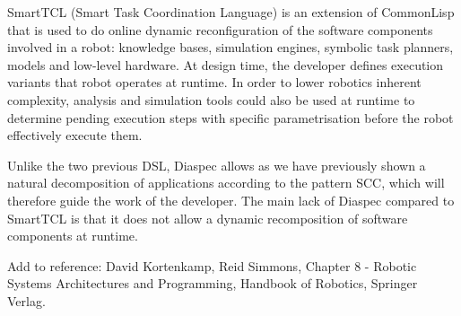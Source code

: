 \begin{enumerate}
SmartTCL (Smart Task Coordination Language) is an extension of CommonLisp that is used to do online dynamic reconfiguration of the software components involved in a robot: knowledge bases, simulation engines, symbolic task planners, models and low-level hardware. At design time, the developer defines execution variants that robot operates at runtime. In order to lower robotics inherent complexity, analysis and simulation tools could also be used at runtime to determine pending execution steps with specific parametrisation before the robot effectively execute them.

Unlike the two previous DSL, Diaspec allows as we have previously shown a natural decomposition of applications according to the pattern SCC, which will therefore guide the work of the developer. The main lack of Diaspec compared to SmartTCL is that it does not allow a dynamic recomposition of software components at runtime.

\end{enumerate}
Add to reference: David Kortenkamp, Reid Simmons, Chapter 8 - Robotic Systems Architectures and Programming, Handbook of Robotics, Springer Verlag.

